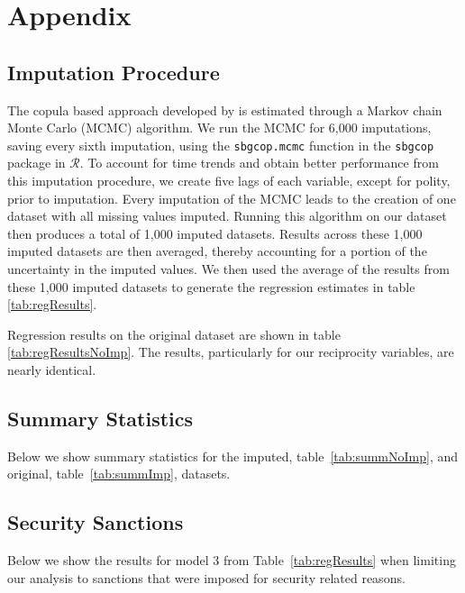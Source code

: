 \newpage
\section*{Appendix}
\label{appendix}

\subsection*{Imputation Procedure}
\label{appImp}

The copula based approach developed by \citet{hoff:2007} is estimated through a Markov chain Monte Carlo (MCMC) algorithm. We run the MCMC for 6,000 imputations, saving every sixth imputation, using the \texttt{sbgcop.mcmc} function in the \texttt{sbgcop} package in $\mathcal{R}$. To account for time trends and obtain better performance from this imputation procedure, we create five lags of each variable, except for polity, prior to imputation. Every imputation of the MCMC leads to the creation of one dataset with all missing values imputed. Running this algorithm on our dataset then produces a total of 1,000 imputed datasets. Results across these 1,000 imputed datasets are then averaged, thereby accounting for a portion of the uncertainty in the imputed values. We then used the average of the results from these 1,000 imputed datasets to generate the regression estimates in table \ref{tab:regResults}. 


\FloatBarrier

Regression results on the original dataset are shown in table \ref{tab:regResultsNoImp}. The results, particularly for our reciprocity variables, are nearly identical. 

\newpage

\subsection*{Summary Statistics}
\label{appSumm}

Below we show summary statistics for the imputed, table~\ref{tab:summNoImp}, and original, table~\ref{tab:summImp}, datasets.


\FloatBarrier


\FloatBarrier

\subsection*{Security Sanctions}
\label{appSecSanc}

Below we show the results for model 3 from Table~\ref{tab:regResults} when limiting our analysis to sanctions that were imposed for security related reasons.


\FloatBarrier

\newpage
